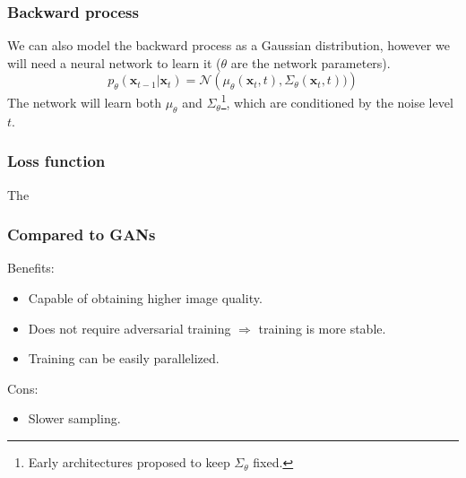 %

\begin{frame}
    \frametitle{Backward process}
    We can also model the backward process as a Gaussian distribution, however we will need a neural network to learn it ($\theta$ are the network parameters).
    $$p_\theta (\textbf{x}_{t-1}| \textbf{x}_t) = \mathcal N\left(\mu_\theta(\textbf{x}_t, t), \Sigma_\theta (\textbf{x}_t, t))\right)$$
    The network will learn both $\mu_\theta$ and $\Sigma_\theta$\footnote{Early architectures proposed to keep $\Sigma_\theta$ fixed.}, which are conditioned by the noise level $t$.
\end{frame}

\begin{frame}
    \frametitle{Loss function}
    The 
\end{frame}

\begin{frame}
    \frametitle{Compared to GANs}
    Benefits:
    \begin{itemize}
        \item Capable of obtaining higher image quality.
        \item Does not require adversarial training $\Rightarrow$ training is more stable.
        \item Training can be easily parallelized.
    \end{itemize}
    Cons:
    \begin{itemize}
        \item Slower sampling.
    \end{itemize}
\end{frame}